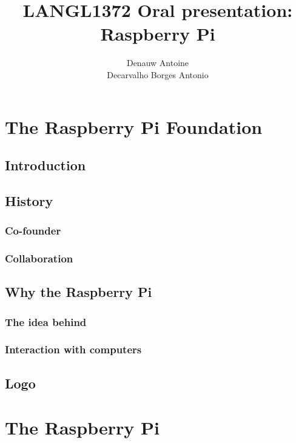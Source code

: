 \documentclass[10pt,a4paper]{article}
\begin{document}
\author{Denauw Antoine\\
		Decarvalho Borges Antonio}
\title{LANGL1372 Oral presentation: Raspberry Pi}
\maketitle

\tableofcontents

\newpage

\section{The Raspberry Pi Foundation}

\subsection{Introduction}

\subsection{History}

\subsubsection{Co-founder}

\subsubsection{Collaboration}

\subsection{Why the Raspberry Pi}

\subsubsection{The idea behind}

\subsubsection{Interaction with computers}

\subsection{Logo}

\section{The Raspberry Pi}
\end{document}
